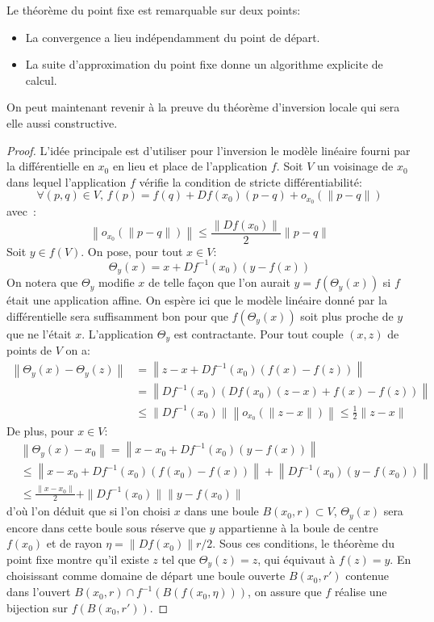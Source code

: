 \begin{rem}
Le théorème du point fixe est remarquable sur deux points: 
\begin{itemize}
\item La convergence a lieu indépendamment du point de départ. 
\item La suite d'approximation du point fixe donne un algorithme explicite de calcul.
\end{itemize}
\end{rem}
On peut maintenant revenir à la preuve du théorème d'inversion locale qui sera elle aussi constructive.
\begin{proof}
L'idée principale est d'utiliser pour l'inversion le modèle linéaire fourni par la différentielle en $x_0$ en lieu et place de l'application $f$. 
Soit $V$ un voisinage de $x_0$ dans lequel l'application $f$ vérifie la condition de stricte différentiabilité:
\[
\forall (p,q) \in V, \, f(p)=f(q) +Df(x_0)(p-q) + o_{x_0}\left(\|p-q\|\right)
\]
 avec~:
 \[
  \left\|o_{x_0}\left(\|p-q\|\right)\right\| \leq \frac{\|Df(x_0)\|}{2} \|p-q\|
 \]
Soit $y \in f(V)$. On pose, pour tout $x \in V$:
\[
\Theta_y(x) = x + Df^{-1}(x_0)\left(y-f(x)\right)
\]
On notera que $\Theta_y$ modifie $x$ de telle façon que l'on aurait $y=f(\Theta_y(x))$ si $f$ était une application affine. On espère ici que le modèle linéaire donné par la différentielle sera suffisamment bon pour que $f(\Theta_y(x))$ soit plus proche de $y$ que ne l'était $x$. L'application $\Theta_y$ est contractante. Pour tout couple $(x,z)$ de points de $V$ on a:
\begin{align*}
\left\|\Theta_y(x) - \Theta_y(z)\right\| &  = \left\|z-x + Df^{-1}(x_0)\left(f(x)-f(z)\right) \right \| \\
& = \left\|Df^{-1}(x_0)\left( Df(x_0)(z-x) + f(x)-f(z)\right) \right \| \\
& \leq \|Df^{-1}(x_0)\|  \left\|o_{x_0}\left(\|z-x\|\right)\right\| \leq \frac{1}{2} \|z-x\|
\end{align*}
De plus, pour $x \in V$:
\begin{align*}
&\left\| \Theta_y(x) - x_0 \right \|  = \left \| x-x_0 + Df^{-1}(x_0)\left(y-f(x)\right) \right \| \\
& \leq \left \| x-x_0 + Df^{-1}(x_0)\left(f(x_0)-f(x) \right) \right \| + \left\| Df^{-1}(x_0)\left(y-f(x_0)\right)\right\| \\
& \leq \frac{\|x-x_0\|}{2} + \|Df^{-1}(x_0)\|\|y-f(x_0)\|
\end{align*}
d'où l'on déduit que si l'on choisi $x$ dans une boule $B(x_0,r) \subset V$, $\Theta_y(x)$ sera encore dans cette boule sous réserve que $y$ appartienne à la boule de centre $f(x_0)$ et de rayon $\eta=\|Df(x_0)\|r/2$. Sous ces conditions, le théorème du point fixe montre qu'il existe $z$ tel que $\Theta_y(z)=z$, qui équivaut à $f(z)=y$. En choisissant comme domaine de départ une boule ouverte $B(x_0,r\prime)$ contenue dans l'ouvert $B(x_0,r) \cap f^{-1}(B(f(x_0,\eta)))$, on assure que $f$ réalise une bijection sur $f(B(x_0,r\prime))$.


\end{proof}
